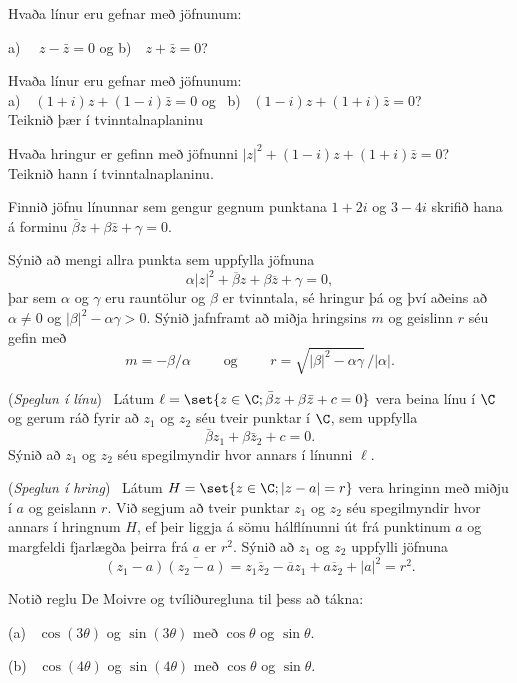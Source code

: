 \daemi Hvaða línur eru gefnar með jöfnunum: 

a) \ \ $z-\bar z=0$ og   b)\ \ $z+\bar z=0$?

\daemi  Hvaða línur eru gefnar með jöfnunum:
\\
a)\ \ $(1+i)z+(1-i)\bar z=0$  og \ b) \ $(1-i)z+(1+i)\bar z=0$?  
\\
Teiknið þær í tvinntalnaplaninu

\daemi   Hvaða hringur er gefinn með jöfnunni 
$|z|^2+(1-i)z+(1+i)\bar z=0$? \\ Teiknið hann í tvinntalnaplaninu.

\daemi Finnið jöfnu línunnar sem gengur gegnum punktana $1+2i$ 
og  $3-4i$ skrifið hana á forminu $\bar \beta z+\beta\bar z+\gamma=0$.

\daemi Sýnið að mengi allra punkta sem uppfylla jöfnuna
 \begin{equation*}\alpha|z|^2+\overline \beta z+\beta\overline z +\gamma=0,
 \end{equation*}
þar sem $\alpha$ og $\gamma$ eru rauntölur og $\beta$ er tvinntala,
sé hringur þá og því aðeins að $\alpha\neq 0$ og 
$|\beta|^2-{\alpha}\gamma>0$.   Sýnið jafnframt að miðja hringsins
$m$ og 
geislinn  $r$ séu gefin með
$$m=-\beta/\alpha\qquad \text{ og } \qquad
r=\sqrt{|\beta|^2-\alpha\gamma}\, /|\alpha|.
$$

\daemi ({\it Speglun í línu}) \ Látum $\ell=\set
{z\in \C;  \bar {\beta}z+{\beta}\bar
z+c=0}$ vera beina línu í $\C$ og gerum ráð fyrir að $z_1$ og
$z_2$ séu tveir punktar í $\C$, sem uppfylla 
$$
\bar {\beta} z_1+{\beta}\bar z_2+c=0.
$$
Sýnið að $z_1$ og $z_2$ séu spegilmyndir hvor annars í línunni $\ell$.

\daemi ({\it Speglun í hring}) \ Látum $H=\set{z\in \C; |z-a|=r}$ vera hringinn með miðju í
$a$ og geislann $r$.  Við segjum að tveir punktar $z_1$ og $z_2$ séu
spegilmyndir hvor annars í hringnum $H$, ef þeir liggja á sömu
hálflínunni út frá punktinum $a$ og margfeldi fjarlægða þeirra frá $a$
er $r^2$.  Sýnið að $z_1$ og $z_2$ uppfylli jöfnuna
$$
(z_1-a)\overline{(z_2-a)}=z_1\overline z_2-\overline a z_1+a\overline
z_2 +|a|^2=r^2.
$$

\daemi Notið reglu De Moivre og tvíliðuregluna 
til þess að tákna:

\smallskip\noindent
(a) \ 
$\cos(3\theta)$  
og $\sin (3\theta)$ með  $\cos\theta$ og $\sin \theta$.


\smallskip\noindent
(b) \ $\cos(4\theta)$  
og $\sin (4\theta)$ með  $\cos\theta$ og $\sin \theta$.

